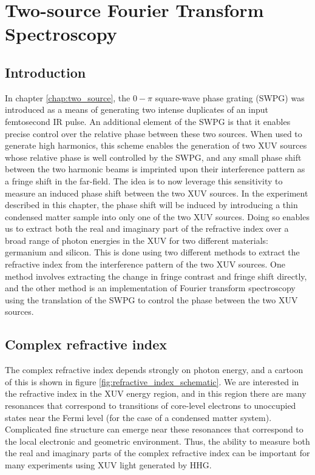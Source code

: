 \chapter{Two-source Fourier Transform Spectroscopy}
\label{chap:refractive_index}

\section{Introduction}
\label{intro_ts}
In chapter \ref{chap:two_source}, the $0-\pi$ square-wave phase grating (SWPG) was introduced as a means of generating two intense duplicates of an input femtosecond IR pulse.  An additional element of the SWPG is that it enables precise control over the relative phase between these two sources.  When used to generate high harmonics, this scheme enables the generation of two XUV sources whose relative phase is well controlled by the SWPG, and any small phase shift between the two harmonic beams is imprinted upon their interference pattern as a fringe shift in the far-field.  The idea is to now leverage this sensitivity to measure an induced phase shift between the two XUV sources.  In the experiment described in this chapter, the phase shift will be induced by introducing a thin condensed matter sample into only one of the two XUV sources.  Doing so enables us to extract both the real and imaginary part of the refractive index over a broad range of photon energies in the XUV for two different materials: germanium and silicon.  This is done using two different methods to extract the refractive index from the interference pattern of the two XUV sources.  One method involves extracting the change in fringe contrast and fringe shift directly, and the other method is an implementation of Fourier transform spectroscopy using the translation of the SWPG to control the phase between the two XUV sources.


\section{Complex refractive index}
The complex refractive index depends strongly on photon energy, and a cartoon of this is shown in figure \ref{fig:refractive_index_schematic}. We are interested in the refractive index in the XUV energy region, and in this region there are many resonances that correspond to transitions of core-level electrons to unoccupied states near the Fermi level (for the case of a condensed matter system)\cite{stohrNEXAFSSpectroscopy1992, attwoodSoftXraysExtreme2000}.  Complicated fine structure can emerge near these resonances that correspond to the local electronic and geometric environment\cite{stohrNEXAFSSpectroscopy1992, attwoodSoftXraysExtreme2000}.  Thus, the ability to measure both the real and imaginary parts of the complex refractive index can be important for many experiments using XUV light generated by HHG\cite{kaplanFemtosecondTrackingCarrier2018,  cirriAchievingSurfaceSensitivity2017}.

